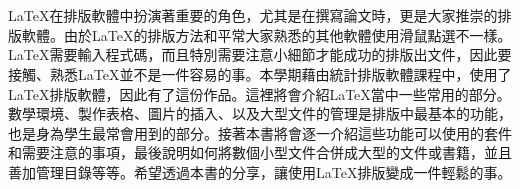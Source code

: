 \chapter*{}

\LaTeX 在排版軟體中扮演著重要的角色，尤其是在撰寫論文時，更是大家推崇的排版軟體。由於\LaTeX 的排版方法和平常大家熟悉的其他軟體使用滑鼠點選不一樣。\LaTeX 需要輸入程式碼，而且特別需要注意小細節才能成功的排版出文件，因此要接觸、熟悉\LaTeX 並不是一件容易的事。本學期藉由統計排版軟體課程中，使用了\LaTeX 排版軟體，因此有了這份作品。這裡將會介紹\LaTeX 當中一些常用的部分。數學環境、製作表格、圖片的插入、以及大型文件的管理是排版中最基本的功能，也是身為學生最常會用到的部分。接著本書將會逐一介紹這些功能可以使用的套件和需要注意的事項，最後說明如何將數個小型文件合併成大型的文件或書籍，並且善加管理目錄等等。希望透過本書的分享，讓使用\LaTeX 排版變成一件輕鬆的事。

